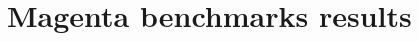 \appendix
\appendixpage

\section{Magenta benchmarks results}
\label{appendix:magenta_benchmark}
\begin{minipage}{\linewidth}
    \begin{adjustbox}{width=\textwidth}
    \end{adjustbox}
\end{minipage}